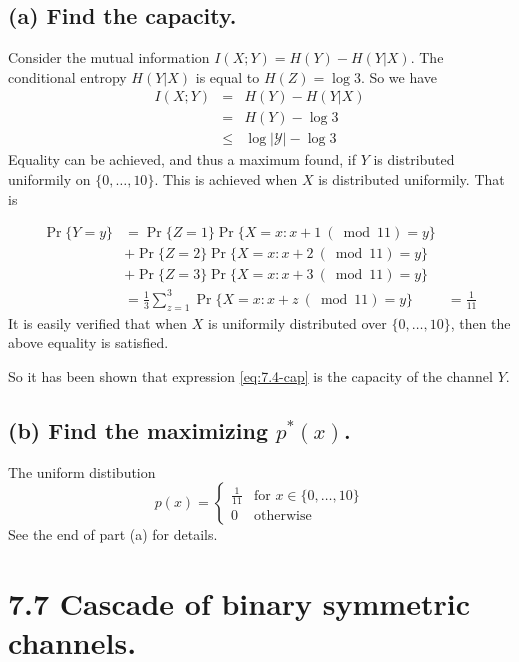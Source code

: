 \documentclass[12pt]{article}
\newcommand{\setbrace}[1]{{\{#1\}}}
\begin{document}
\subsection*{\textbf{(a)} Find the capacity.}

Consider the mutual information $I(X;Y) = H(Y) - H(Y|X)$. The conditional
entropy $H(Y|X)$ is equal to $H(Z)=\log 3$.
So we have
\begin{eqnarray}
    I(X;Y) &=& H(Y) - H(Y|X) \nonumber \\
        &=& H(Y) - \log 3 \nonumber \\
        &\leq& \log {\vert \mathcal{Y} \vert} - \log 3 \label{eq:7.4-cap}
\end{eqnarray}
Equality can be achieved, and thus a maximum found, if $Y$ is distributed
uniformily on $\setbrace{0,\dots,10}$. This is achieved when $X$ is
distributed uniformily. That is

\begin{align*}
    \Pr \setbrace{Y=y} &= 
    \Pr \setbrace{Z=1} \Pr \setbrace{X = x : x+1\ (\bmod 11) = y} \\
    &+ \Pr \setbrace{Z=2} \Pr \setbrace{X = x : x+2\ (\bmod 11) = y} \\
    &+ \Pr \setbrace{Z=3} \Pr \setbrace{X = x : x+3\ (\bmod 11) = y} \\
    &= \frac{1}{3}\sum_{z=1}^{3} \Pr \setbrace{X = x : x+z\ (\bmod 11) = y}
    &= \frac{1}{11}
\end{align*}
It is easily verified that when $X$ is uniformily distributed over
$\setbrace{0,\dots,10}$, then the above equality is satisfied.

So it has been shown that expression \ref{eq:7.4-cap} is the capacity of
the channel $Y$.

\subsection*{\textbf{(b)} Find the maximizing $p^*(x)$.}

The uniform distibution
\begin{equation*}
    p(x)= \begin{cases}
        \frac{1}{11} & \text{for $x \in \setbrace{0,\dots,10}$} \\
        0 & \text{otherwise}
    \end{cases}
\end{equation*}
See the end of part (a) for details.

\section*{7.7 Cascade of binary symmetric channels.}
\end{document}
